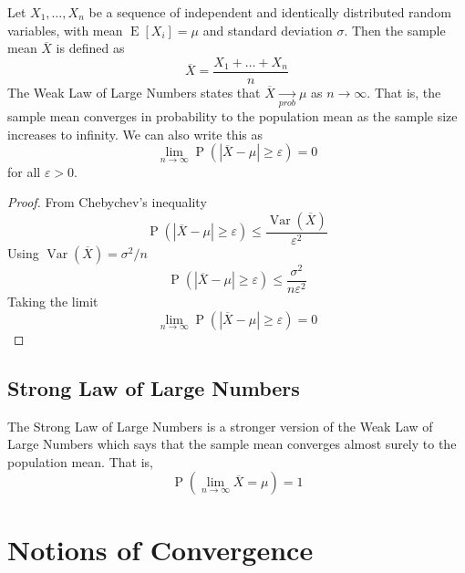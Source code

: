 \documentclass[11pt]{report} %
\begin{document}
Let $X_{1}, \dots, X_{n}$ be a sequence of independent and identically distributed random variables, with mean $\operatorname{E}\left[X_{i}\right] = \mu$ and standard deviation $\sigma$. Then the sample mean $\overline{X}$ is defined as
\begin{equation}
\overline{X} = \dfrac{X_{1} + \dots + X_{n}}{n}
\end{equation}
The Weak Law of Large Numbers states that $\overline{X} \underset{prob}{\rightarrow} \mu$ as $n \rightarrow \infty$. That is, the sample mean converges in probability to the population mean as the sample size increases to infinity. We can also write this as
\begin{equation}
\lim_{n\rightarrow\infty}\operatorname{P}\left(\left|\overline{X} - \mu\right|\geq \varepsilon \right) = 0
\end{equation}
for all $\varepsilon > 0$.
\begin{proof}
From Chebychev's inequality
\begin{equation}
\operatorname{P}\left(\left|\overline{X} - \mu\right| \geq \varepsilon\right) \leq \dfrac{\operatorname{Var}\left(\overline{X}\right)}{\varepsilon^{2}}
\end{equation}
Using $\operatorname{Var}\left(\overline{X}\right) = \sigma^{2}/n$
\begin{equation}
\operatorname{P}\left(\left|\overline{X} - \mu\right| \geq \varepsilon\right) \leq \dfrac{\sigma^{2}}{n\varepsilon^{2}}
\end{equation}
Taking the limit
\begin{equation}
\lim_{n\rightarrow\infty}\operatorname{P}\left(\left|\overline{X} - \mu\right|\geq \varepsilon \right) = 0
\end{equation}
\end{proof}

\subsection{Strong Law of Large Numbers}

The Strong Law of Large Numbers is a stronger version of the Weak Law of Large Numbers which says that the sample mean converges almost surely to the population mean. That is,
\begin{equation}
\operatorname{P}\left(\lim_{n\rightarrow\infty}\overline{X} = \mu\right) = 1
\end{equation}

\section{Notions of Convergence}
\end{document}
